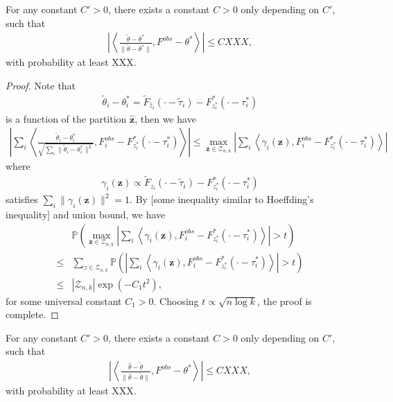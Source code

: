 \begin{lemma}
For any constant $C'>0$, there exists a constant $C>0$ only depending on $C'$, such that
\begin{align*}
\left| \left\langle \frac{\tilde \theta -  \theta^*}{\| \tilde \theta - \theta^* \|}, F^{obs} - \theta^* \right\rangle \right|
 \leq C XXX,
\end{align*}
with probability at least XXX.
\end{lemma}

\begin{proof}
Note that
\begin{align*}
\tilde \theta_i - \theta^*_i 
= \tilde F_{\hat z_i}(\cdot - \tilde \tau_i) - F^*_{z^*_i}(\cdot-\tau^*_i)
\end{align*}
is a function of the partition $\mathbf{\hat z}$, then we have
\begin{align*}
\left| \sum_i 
\left\langle 
\frac{\tilde \theta_i-\theta^*_i}{\sqrt{\sum_i \| \tilde \theta_i - \theta^*_i \|^2}} 
, F_i^{obs}-F^*_{z^*_i}(\cdot-\tau^*_i) \right\rangle   
\right|
\leq \max_{\mathbf{z}\in \mathcal Z_{n,k}}
\left | 
 \sum_{i} \left\langle \gamma_i(\mathbf{z})
 , F_i^{obs}-F^*_{z^*_i}(\cdot-\tau^*_i) \right\rangle   \right|
\end{align*}
where 
\begin{align*}
\gamma_i(\mathbf{z})\propto 
\tilde F_{ z_i}(\cdot - \tilde \tau_i) - F^*_{z^*_i}(\cdot-\tau^*_i)
\end{align*}
satisfies $\sum_i \|\gamma_i(\mathbf{z})\|^2=1$.
By [some inequality similar to Hoeffding's inequality] and union bound, we have
\begin{align*}
&\mathbb{P}\left( 
\max_{\mathbf{z}\in \mathcal Z_{n,k}} 
\left| \sum_{i} 
\left\langle \gamma_i(\mathbf{z}), F^{obs}_i-F^*_{z^*_i}(\cdot-\tau^*_i) \right\rangle 
\right| 
>t \right) \\
\leq& \sum_{z\in \mathcal Z_{n,k}}
\mathbb{P} 
\left( \left| \sum_{i} 
\left\langle \gamma_i(\mathbf{z}), F^{obs}_i-F^*_{z^*_i}(\cdot-\tau^*_i) \right\rangle 
\right| 
>t \right) \\
\leq & |\mathcal Z_{n,k}| \exp \left( -C_1t^2 \right) ,
\end{align*}
for some universal constant $C_1>0$.
Choosing $t\propto \sqrt{n\log k} $, the proof is complete.




\end{proof}


\begin{lemma}
For any constant $C'>0$, there exists a constant $C>0$ only depending on $C'$, such that
\begin{align*}
\left| \left\langle \frac{\hat \theta - \tilde \theta}{\| \hat \theta - \tilde \theta \|}, F^{obs} - \theta^* \right\rangle \right|
 \leq C XXX,
\end{align*}
with probability at least XXX.
\end{lemma}

